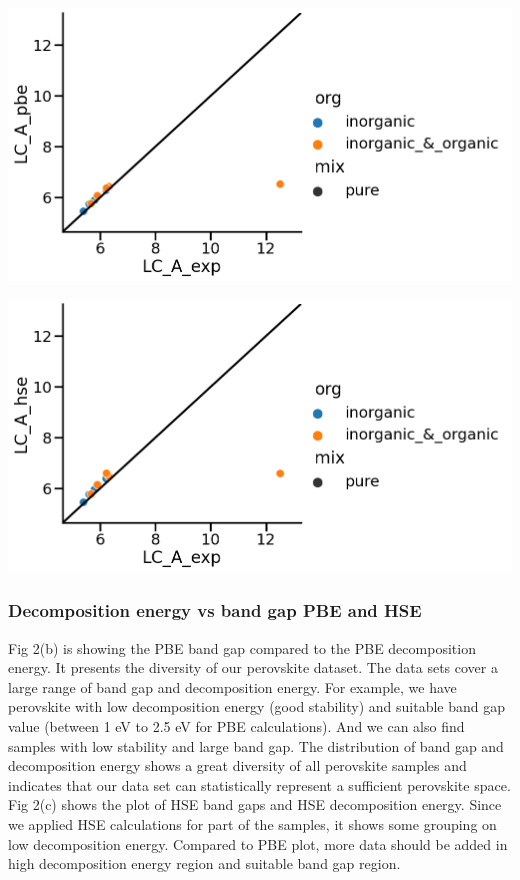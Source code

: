\documentclass[twoside, twocolumn, 9pt, draft]{article}
\begin{document}
\begin{center}
\includegraphics[width=.9\linewidth]{pbe_v_exp_LC.png}
\end{center}
\begin{center}
\includegraphics[width=.9\linewidth]{hse_v_exp_LC.png}
\end{center}

\subsubsection*{Decomposition energy vs band gap PBE and HSE}
\label{sec:org2213b80}
Fig 2(b) is showing the PBE band gap compared to the PBE decomposition
energy. It presents the diversity of our perovskite dataset. The data
sets cover a large range of band gap and decomposition energy. For
example, we have perovskite with low decomposition energy (good
stability) and suitable band gap value (between 1 eV to 2.5 eV for PBE
calculations). And we can also find samples with low stability and large
band gap. The distribution of band gap and decomposition energy shows a
great diversity of all perovskite samples and indicates that our data
set can statistically represent a sufficient perovskite space. Fig 2(c)
shows the plot of HSE band gaps and HSE decomposition energy. Since we
applied HSE calculations for part of the samples, it shows some grouping
on low decomposition energy. Compared to PBE plot, more data should be
added in high decomposition energy region and suitable band gap region.
\end{document}
